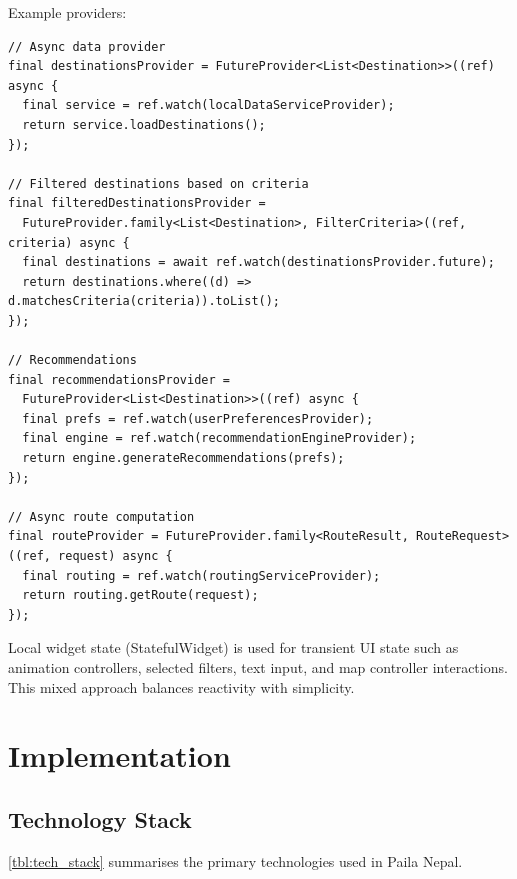 \documentclass[12pt,a4paper,oneside]{report}
\begin{document}
Example providers:

\begin{lstlisting}
// Async data provider
final destinationsProvider = FutureProvider<List<Destination>>((ref) async {
  final service = ref.watch(localDataServiceProvider);
  return service.loadDestinations();
});

// Filtered destinations based on criteria
final filteredDestinationsProvider = 
  FutureProvider.family<List<Destination>, FilterCriteria>((ref, criteria) async {
  final destinations = await ref.watch(destinationsProvider.future);
  return destinations.where((d) => d.matchesCriteria(criteria)).toList();
});

// Recommendations
final recommendationsProvider = 
  FutureProvider<List<Destination>>((ref) async {
  final prefs = ref.watch(userPreferencesProvider);
  final engine = ref.watch(recommendationEngineProvider);
  return engine.generateRecommendations(prefs);
});

// Async route computation
final routeProvider = FutureProvider.family<RouteResult, RouteRequest>((ref, request) async {
  final routing = ref.watch(routingServiceProvider);
  return routing.getRoute(request);
});
\end{lstlisting}

Local widget state (StatefulWidget) is used for transient UI state such as animation controllers, selected filters, text input, and map controller interactions. This mixed approach balances reactivity with simplicity.
\chapter{Implementation}
\label{ch:implementation}

\section{Technology Stack}
\label{sec:tech_stack}

\cref{tbl:tech_stack} summarises the primary technologies used in Paila Nepal.
\end{document}
